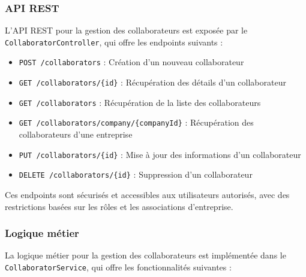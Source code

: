 \subsubsection{API REST}

L'API REST pour la gestion des collaborateurs est exposée par le \texttt{CollaboratorController}, qui offre les endpoints suivants :

\vspace{0.5cm}

\begin{tcolorbox}[
  title={\textbf{Endpoints de gestion des collaborateurs}},
  colback=blue!5!white,
  colframe=primarycolor,
  fonttitle=\bfseries,
  boxrule=0.5mm,
  arc=2mm,
  left=6mm,
  right=6mm,
  top=6mm,
  bottom=6mm
]
\begin{itemize}[leftmargin=*,label=\textcolor{darkgray}{$\bullet$},itemsep=0.3em]
  \item \texttt{POST /collaborators} : Création d'un nouveau collaborateur
  \item \texttt{GET /collaborators/\{id\}} : Récupération des détails d'un collaborateur
  \item \texttt{GET /collaborators} : Récupération de la liste des collaborateurs
  \item \texttt{GET /collaborators/company/\{companyId\}} : Récupération des collaborateurs d'une entreprise
  \item \texttt{PUT /collaborators/\{id\}} : Mise à jour des informations d'un collaborateur
  \item \texttt{DELETE /collaborators/\{id\}} : Suppression d'un collaborateur
\end{itemize}
\end{tcolorbox}

\vspace{0.5cm}

Ces endpoints sont sécurisés et accessibles aux utilisateurs autorisés, avec des restrictions basées sur les rôles et les associations d'entreprise.

\newpage

\subsubsection{Logique métier}

La logique métier pour la gestion des collaborateurs est implémentée dans le\\ \texttt{CollaboratorService}, qui offre les fonctionnalités suivantes :

